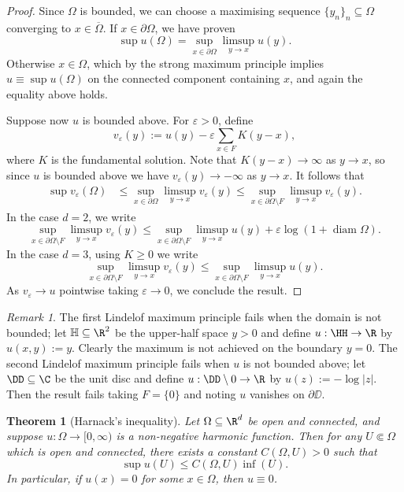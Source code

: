 \documentclass[reqno]{amsart}
\newtheorem{theorem}{Theorem}
\theoremstyle{definition}
\theoremstyle{remark}
\newtheorem*{remark}{Remark}
\renewcommand{\epsilon}{\varepsilon}
\begin{document}
\begin{proof}
	Since $\Omega$ is bounded, we can choose a maximising sequence $\{y_n\}_n \subseteq \Omega$ converging to $x \in \overline \Omega$. If $x \in \partial \Omega$, we have proven 
		\[ \sup u(\Omega) = \sup_{x \in \partial \Omega} \limsup_{y \to x} u(y). \]
	Otherwise $x \in \Omega$, which by the strong maximum principle implies $u \equiv \sup u(\Omega)$ on the connected component containing $x$, and again the equality above holds. 
	
	Suppose now $u$ is bounded above. For $\epsilon > 0$, define
		\[ v_\epsilon (y) := u(y) - \epsilon \sum_{x \in F} K(y - x), \]
	where $K$ is the fundamental solution. Note that $K(y - x) \to \infty$ as $y \to x$, so since $u$ is bounded above we have $v_\epsilon (y) \to -\infty$ as $y \to x$. It follows that 
		\begin{align*}
			\sup v_\epsilon (\Omega)
				&\leq \sup_{x \in \partial \Omega} \limsup_{y \to x} v_\epsilon (y) \leq \sup_{x \in \partial \Omega \setminus F} \limsup_{y \to x} v_\epsilon (y).
		\end{align*}
	In the case $d = 2$, we write
		\[ \sup_{x \in \partial \Omega \setminus F} \limsup_{y \to x} v_\epsilon (y) \leq \sup_{x \in \partial \Omega \setminus F} \limsup_{y \to x} u(y) + \epsilon \log (1 + \operatorname{diam} \Omega). \]
	In the case $d = 3$, using $K \geq 0$ we write
		\[ \sup_{x \in \partial \Omega \setminus F} \limsup_{y \to x} v_\epsilon (y) \leq \sup_{x \in \partial \Omega \setminus F} \limsup_{y \to x} u (y). \]	
	As $v_\epsilon \to u$ pointwise taking $\epsilon \to 0$, we conclude the result. 
\end{proof}	

\begin{remark}
	The first Lindelof maximum principle fails when the domain is not bounded; let $\mathbb H \subseteq \R^2$ be the upper-half space $y > 0$ and define $u : \HH \to \R$ by $u(x, y) := y$. Clearly the maximum is not achieved on the boundary $y = 0$. The second Lindelof maximum principle fails when $u$ is not bounded above; let $\DD \subseteq \C$ be the unit disc and define $u: \DD \setminus 0 \to \R$ by $u(z) := - \log |z|$. Then the result fails taking $F = \{0\}$ and noting $u$ vanishes on $\partial \DD$. 
\end{remark}



\begin{theorem}[Harnack's inequality]
	Let $\Omega \subseteq \R^d$ be open and connected, and suppose $u: \Omega \to [0, \infty)$ is a non-negative harmonic function. Then for any $U \Subset \Omega$ which is open and connected, there exists a constant $C(\Omega, U) > 0$ such that
		\[ \sup u( U) \leq C(\Omega, U) \inf ( U). \]
	In particular, if $u(x) = 0$ for some $x \in \Omega$, then $u \equiv 0$. 		
\end{theorem}
\end{document}
